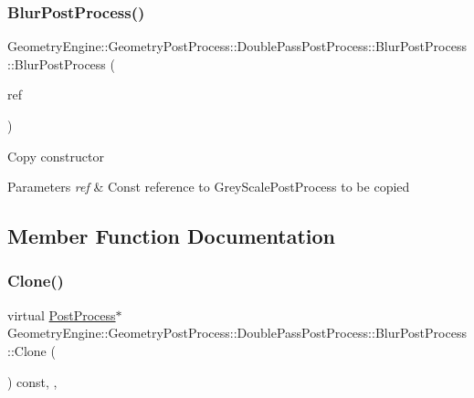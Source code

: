 \subsubsection{\texorpdfstring{BlurPostProcess()}{BlurPostProcess()}\hspace{0.1cm}{\footnotesize\ttfamily [2/2]}}
{\footnotesize\ttfamily Geometry\+Engine\+::\+Geometry\+Post\+Process\+::\+Double\+Pass\+Post\+Process\+::\+Blur\+Post\+Process\+::\+Blur\+Post\+Process (\begin{DoxyParamCaption}\item[{const \mbox{\hyperlink{class_geometry_engine_1_1_geometry_post_process_1_1_double_pass_post_process_1_1_blur_post_process}{Blur\+Post\+Process}} \&}]{ref }\end{DoxyParamCaption})}

Copy constructor 
\begin{DoxyParams}{Parameters}
{\em ref} & Const reference to Grey\+Scale\+Post\+Process to be copied \\
\hline
\end{DoxyParams}


\subsection{Member Function Documentation}
\mbox{\label{class_geometry_engine_1_1_geometry_post_process_1_1_double_pass_post_process_1_1_blur_post_process_a4399f435326724c64cf255a40479d330}} 
\subsubsection{\texorpdfstring{Clone()}{Clone()}}
{\footnotesize\ttfamily virtual \mbox{\hyperlink{class_geometry_engine_1_1_geometry_post_process_1_1_post_process}{Post\+Process}}$\ast$ Geometry\+Engine\+::\+Geometry\+Post\+Process\+::\+Double\+Pass\+Post\+Process\+::\+Blur\+Post\+Process\+::\+Clone (\begin{DoxyParamCaption}{ }\end{DoxyParamCaption}) const\hspace{0.3cm}{\ttfamily [inline]}, {\ttfamily [override]}, {\ttfamily [virtual]}}

